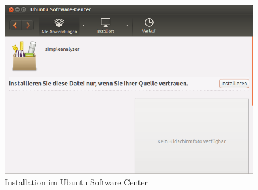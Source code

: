 \documentclass[10pt,a5paper,twoside,titlepage]{scrartcl}
\begin{document}
	\begin{figure}
	\centering	\includegraphics[clip=true,trim=0 5cm 0 0,scale=.3]{Ubuntu_Software_Center_002.png}
	\caption{Installation im Ubuntu Software Center}
	\end{figure}
		
\end{document}

